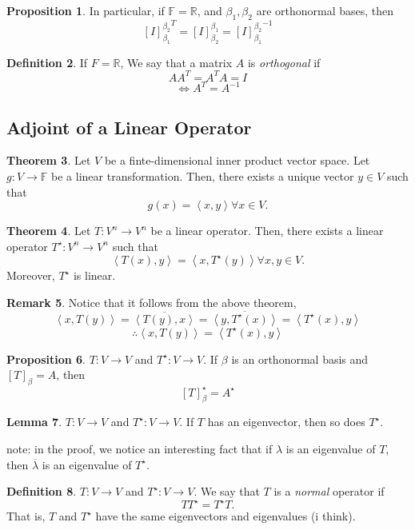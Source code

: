 \documentclass[a5paper]{article}
\theoremstyle{definition}%
\newtheorem{theorem}{Theorem}
\numberwithin{theorem}{section} %
\newtheorem{definition}[theorem]{Definition}
\newtheorem{lemma}[theorem]{Lemma}
\newtheorem{proposition}[theorem]{Proposition}
\newtheorem{remark}[theorem]{Remark}
\newcommand{\R}{\mathbb{R}}
\newcommand{\F}{\mathbb{F}}
\newcommand*\conj[1]{\overline{#1}}
\newcommand{\inner}[1]{\left< #1 \right>}
\begin{document}
\begin{proposition}
In particular, if $\F = \R$, and $\beta_1, \beta_2$ are orthonormal bases, then 
$${[I]_{\beta_1}^{\beta_2}}^{T} = [I]_{\beta_2}^{\beta_1} = {[I]_{\beta_1}^{\beta_2}}^{-1}$$
\end{proposition}

\begin{definition}
If $F = \R$, We say that a matrix $A$ is \emph{orthogonal} if 
$$AA^T = A^TA=I$$
$$\iff A^T=A^{-1}$$
\end{definition}

\subsection{Adjoint of a Linear Operator}

\begin{theorem}
Let $V$ be a finte-dimensional inner product vector space. Let $g:V \to \F$ be a linear transformation. Then, there exists a unique vector $y \in V$ such that 
$$g(x)=\inner{x,y} \forall x \in V.$$
\end{theorem}

\begin{theorem}
Let $T:V^n \to V^n$ be a linear operator. Then, there exists a linear operator $T^\star:V^n \to V^n$ such that 
$$\inner{T(x),y} = \inner{x, T^\star(y)} \forall x,y \in V.$$
Moreover, $T^\star$ is linear. 
\end{theorem}

\begin{remark}
Notice that it follows from the above theorem, 
$$\inner{x, T(y)} = \conj{\inner{T(y), x}} = \conj{\inner{y, T^\star(x)}} = \inner{T^\star(x),y}$$
$$\therefore \inner{x,T(y)} = \inner{T^\star(x),y}$$
\end{remark}

\begin{proposition}
$T:V \to V$ and $T^\star: V \to V$. If $\beta$ is an orthonormal basis and $[T]_\beta = A$, then 
$$[T]^\star_\beta = A^\star$$
\end{proposition}

\begin{lemma}
$T:V \to V$ and $T^\star: V \to V$. If $T$ has an eigenvector, then so does $T^\star$. 

note: in the proof, we notice an interesting fact that if $\lambda$ is an eigenvalue of $T$, then $\conj{\lambda}$ is an eigenvalue of $T^\star$. 
\end{lemma}

\begin{definition}
$T:V \to V$ and $T^\star : V \to V$. We say that $T$ is a \emph{normal} operator if $$TT^\star =T^\star T.$$ That is, $T$ and $T^\star$ have the same eigenvectors and eigenvalues (i think).
\end{definition}
\end{document}

